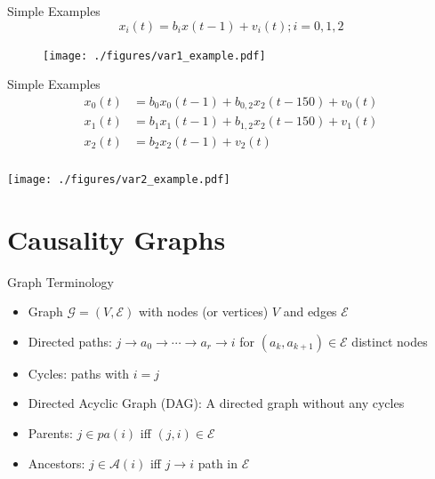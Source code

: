 \documentclass{beamer} %
\def\gcg{\mathcal{G}}  %
\def\gcge{\mathcal{E}}  %
\newcommand{\pa}[1]{pa(#1)}  %
\newcommand{\anc}[1]{\mathcal{A}(#1)}  %
\begin{document}
\begin{frame}{Simple Examples}
  \begin{equation*}
    x_i(t) = b_i x(t - 1) + v_i(t); i = 0, 1, 2
  \end{equation*}

  \begin{figure}
    \texttt{[image: ./figures/var1\_example.pdf]}
  \end{figure}
\end{frame}

\begin{frame}{Simple Examples}
  \begin{equation*}
    \begin{aligned}
      x_0(t) &= b_0 x_0(t - 1) + b_{0, 2} x_2(t - 150) + v_0(t)\\
      x_1(t) &= b_1 x_1(t - 1) + b_{1, 2} x_2(t - 150) + v_1(t)\\
      x_2(t) &= b_2 x_2(t - 1) + v_2(t)\\
    \end{aligned}
  \end{equation*}

  \centering
  \texttt{[image: ./figures/var2\_example.pdf]}
\end{frame}

\section{Causality Graphs}
\begin{frame}{Graph Terminology}
  \begin{itemize}
    \item{Graph $\gcg = (V, \gcge)$ with nodes (or vertices) $V$ and edges $\gcge$}\pause
    \item{Directed paths: $j \rightarrow a_0 \rightarrow \cdots \rightarrow a_r \rightarrow i$ for $(a_{k}, a_{k + 1}) \in \gcge$ distinct nodes}\pause
    \item{Cycles: paths with $i = j$}
    \item{Directed Acyclic Graph (DAG): A directed graph without any cycles}\pause
    \item{Parents: $j \in \pa{i}$ iff $(j, i) \in \gcge$}\pause
    \item{Ancestors: $j \in \anc{i}$ iff $j \rightarrow i$ path in $\gcge$}
  \end{itemize}
\end{frame}
\end{document}
